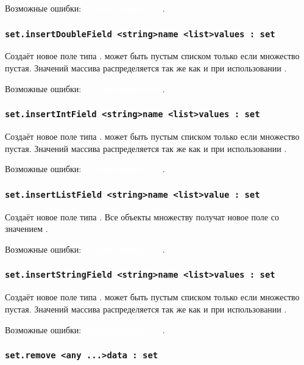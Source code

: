 \documentclass[a4paper, 14pt]{extarticle}
\newcommand{\ferror}[1]{{\fontsize{11pt}{12pt} \tt \colorbox{function}{\textcolor{white}{#1}}}}
\begin{document}
Возможные ошибки: \ferror{FieldAlreadyExists}.

\subsubsection{\lstinline|set.insertDoubleField <string>name <list>values : set|}

Создаёт новое поле типа \double.  может быть пустым списком только если множество пустая. Значений массива распределяется так же как и при использовании .

Возможные ошибки: \ferror{FieldAlreadyExists}.

\subsubsection{\lstinline|set.insertIntField <string>name <list>values : set|}

Создаёт новое поле типа \integer.  может быть пустым списком только если множество пустая. Значений массива распределяется так же как и при использовании .

Возможные ошибки: \ferror{FieldAlreadyExists}.

\subsubsection{\lstinline|set.insertListField <string>name <list>value : set|}

Создаёт новое поле типа \bool. Все объекты множеству получат новое поле со значением .

Возможные ошибки: \ferror{FieldAlreadyExists}.

\subsubsection{\lstinline|set.insertStringField <string>name <list>values : set|}

Создаёт новое поле типа \str.  может быть пустым списком только если множество пустая. Значений массива распределяется так же как и при использовании .

Возможные ошибки: \ferror{FieldAlreadyExists}.

\subsubsection{\lstinline|set.remove <any ...>data : set|}
\end{document}
